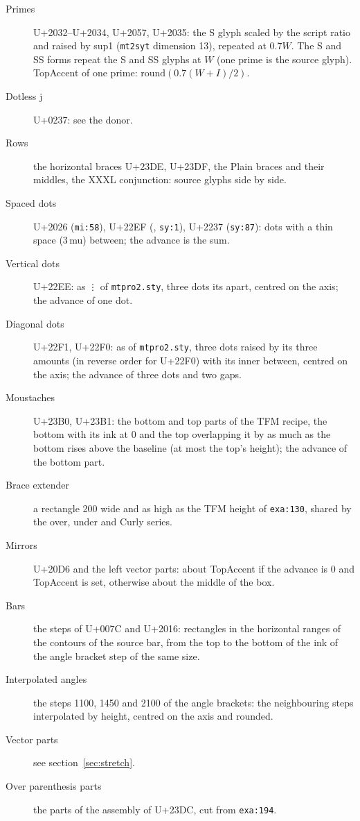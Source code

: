 \documentclass[10pt]{article}
\newcommand\file[1]{\texttt{#1}}
\newcommand\code[1]{\texttt{#1}}
\newcommand\U[1]{U+#1}
\newcommand\slot[2]{\texttt{#1:#2}}
\begin{document}
\begin{description}
\item[Primes] \U{2032}--\U{2034}, \U{2057}, \U{2035}: the S glyph
  scaled by the script ratio and raised by sup1 (\file{mt2syt}
  dimension 13), repeated at $0.7W$.  The S and SS forms repeat the S
  and SS glyphs at $W$ (one prime is the source glyph).  TopAccent of
  one prime: $\mathrm{round}(0.7(W + I)/2)$.
\item[Dotless j] \U{0237}: see the donor.
\item[Rows] the horizontal braces \U{23DE}, \U{23DF}, the Plain braces
  and their middles, the XXXL conjunction: source glyphs side by side.
\item[Spaced dots] \U{2026} (\slot{mi}{58}), \U{22EF}
  (\code{\string\cdotp}, \slot{sy}{1}), \U{2237} (\slot{sy}{87}): dots
  with a thin space (3\,mu) between; the advance is the sum.
\item[Vertical dots] \U{22EE}: as \code{\string\vdots} of
  \file{mtpro2.sty}, three dots its \code{\string\baselineskip} apart,
  centred on the axis; the advance of one dot.
\item[Diagonal dots] \U{22F1}, \U{22F0}: as \code{\string\ddots} of
  \file{mtpro2.sty}, three dots raised by its three
  \code{\string\raise} amounts (in reverse order for \U{22F0}) with
  its inner \code{\string\mkern} between, centred on the axis; the
  advance of three dots and two gaps.
\item[Moustaches] \U{23B0}, \U{23B1}: the bottom and top parts of the
  TFM recipe, the bottom with its ink at 0 and the top overlapping it
  by as much as the bottom rises above the baseline (at most the top's
  height); the advance of the bottom part.
\item[Brace extender] a rectangle 200 wide and as high as the TFM height
  of \slot{exa}{130}, shared by the over, under and Curly series.
\item[Mirrors] \U{20D6} and the left vector parts: about TopAccent if
  the advance is 0 and TopAccent is set, otherwise about the middle of
  the box.
\item[Bars] the steps of \U{007C} and \U{2016}: rectangles in the
  horizontal ranges of the contours of the source bar, from the top to
  the bottom of the ink of the angle bracket step of the same size.
\item[Interpolated angles] the steps 1100, 1450 and 2100 of the angle
  brackets: the neighbouring steps interpolated by height, centred on
  the axis and rounded.
\item[Vector parts] see section~\ref{sec:stretch}.
\item[Over parenthesis parts] the parts of the assembly of \U{23DC},
  cut from \slot{exa}{194}.
\end{description}
\end{document}
